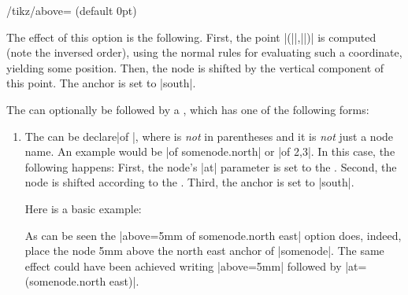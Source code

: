 \begin{key}{/tikz/above= (default 0pt)}
\begin{enumerate}
    The effect of this option is the following. First, the point
    |(||,||)|
    is computed (note the inversed order), using the normal rules for
    evaluating such a coordinate, yielding some position. Then, the
    node is shifted by the vertical component of this point. The
    anchor is set to |south|.
\begin{codeexample}[]
\end{codeexample}
  \end{enumerate}
  The  can optionally be followed by a
  , which has one of the following forms:
  \begin{enumerate}
  \item The  can be declare{|of |},
    where is \emph{not} in parentheses and it is
    \emph{not} just a node name. An example would be
    |of somenode.north| or |of 2,3|. In this case, the
    following happens: First, the node's |at| parameter is set to the
    . Second, the node is shifted according to the
    . Third, the anchor is set to |south|.

    Here is a basic example:
\begin{codeexample}[]
\end{codeexample}
    As can be seen the |above=5mm of somenode.north east| option does,
    indeed, place the node 5mm above the north east anchor of
    |somenode|. The same effect could have been achieved writing
    |above=5mm| followed by |at=(somenode.north east)|.


\end{enumerate}
\end{key}
